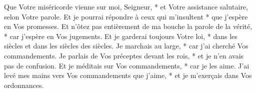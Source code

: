 Que Votre miséricorde vienne sur moi, Seigneur, * et Votre assistance salutaire, selon Votre parole.
\versseparator
Et je pourrai répondre à ceux qui m'insultent * que j'espère en Vos promesses.
\versseparator
Et n'ôtez pas entièrement de ma bouche la parole de la vérité, * car j'espère en Vos jugements.
\versseparator
Et je garderai toujours Votre loi, * dans les siècles et dans les siècles des siècles.
\versseparator
Je marchais au large, * car j'ai cherché Vos commandements.
\versseparator
Je parlais de Vos préceptes devant les rois, * et je n'en avais pas de confusion.
\versseparator
Et je méditais sur Vos commandements, * car je les aime.
\versseparator
J'ai levé mes mains vers Vos commandements que j'aime, * et je m'exerçais dans Vos ordonnances.
